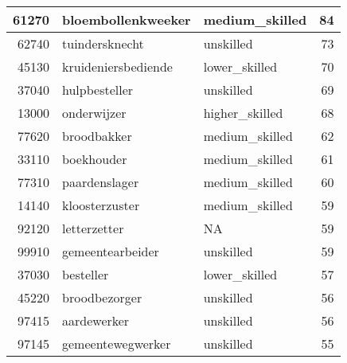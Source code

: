 \begin{table}
\begin{tabular}[t]{r|l|l|r}
\hline
61270 & bloembollenkweeker & medium\_skilled & 84\\
\hline
62740 & tuindersknecht & unskilled & 73\\
\hline
45130 & kruideniersbediende & lower\_skilled & 70\\
\hline
37040 & hulpbesteller & unskilled & 69\\
\hline
13000 & onderwijzer & higher\_skilled & 68\\
\hline
77620 & broodbakker & medium\_skilled & 62\\
\hline
33110 & boekhouder & medium\_skilled & 61\\
\hline
77310 & paardenslager & medium\_skilled & 60\\
\hline
14140 & kloosterzuster & medium\_skilled & 59\\
\hline
92120 & letterzetter & NA & 59\\
\hline
99910 & gemeentearbeider & unskilled & 59\\
\hline
37030 & besteller & lower\_skilled & 57\\
\hline
45220 & broodbezorger & unskilled & 56\\
\hline
97415 & aardewerker & unskilled & 56\\
\hline
97145 & gemeentewegwerker & unskilled & 55\\
\hline
\end{tabular}
\end{table}
